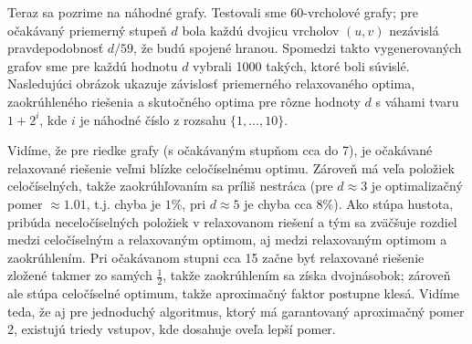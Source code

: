 \noindent
Teraz sa pozrime na náhodné grafy. Testovali sme 60-vrcholové grafy; pre očakávaný
priemerný stupeň $d$ bola každú dvojicu vrcholov $(u,v)$  nezávislá pravdepodobnosť $d/59$, že 
budú spojené hranou. Spomedzi takto vygenerovaných grafov sme pre každú hodnotu $d$ vybrali 1000 
takých, ktoré boli súvislé. Nasledujúci obrázok ukazuje závislosť priemerného relaxovaného optima,
zaokrúhleného riešenia a skutočného optima pre rôzne hodnoty $d$ s váhami tvaru $1+2^i$, kde $i$ 
je náhodné číslo z rozsahu $\{1,\ldots,10\}$.

\begin{center}
\end{center}

\noindent
Vidíme, že pre riedke grafy (s očakávaným stupňom cca do 7), je očakávané relaxované riešenie veľmi blízke
celočíselnému optimu. Zároveň má veľa položiek celočíselných, takže zaokrúhľovaním sa príliš nestráca
(pre $d\approx3$ je optimalizačný pomer $\approx1.01$, t.j. chyba je $1\%$, 
pri $d\approx5$ je chyba cca $8\%$). Ako stúpa hustota, pribúda neceločíselných položiek v relaxovanom riešení
a tým sa zväčšuje rozdiel medzi celočíselným a relaxovaným optimom, aj medzi relaxovaným optimom a 
zaokrúhlením. Pri očakávanom stupni cca 15 začne byť relaxované riešenie zložené takmer zo samých $\frac{1}{2}$,
takže zaokrúhlením sa získa dvojnásobok; zároveň ale stúpa celočíselné optimum, takže aproximačný faktor
postupne klesá. Vidíme teda, že aj pre jednoduchý algoritmus, ktorý má garantovaný aproximačný pomer 2, 
existujú triedy vstupov, kde dosahuje oveľa lepší pomer.

